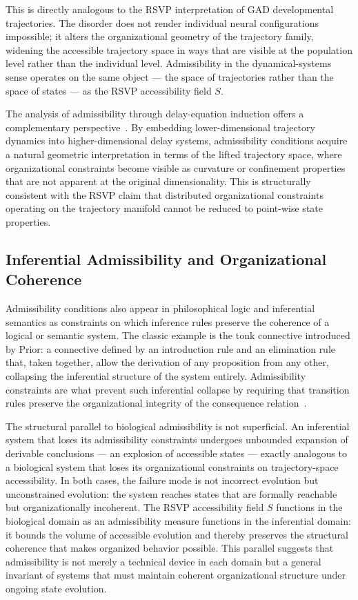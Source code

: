 \documentclass[11pt,a4paper]{article}
\theoremstyle{plain}
\theoremstyle{definition}
\begin{document}
This is directly analogous to the RSVP interpretation of GAD developmental trajectories.
The disorder does not render individual neural configurations impossible; it alters the
organizational geometry of the trajectory family, widening the accessible trajectory
space in ways that are visible at the population level rather than the individual level.
Admissibility in the dynamical-systems sense operates on the same object --- the space
of trajectories rather than the space of states --- as the RSVP accessibility field $S$.

The analysis of admissibility through delay-equation induction offers a complementary
perspective~\cite{Barreira2024}. By embedding lower-dimensional trajectory dynamics
into higher-dimensional delay systems, admissibility conditions acquire a natural
geometric interpretation in terms of the lifted trajectory space, where organizational
constraints become visible as curvature or confinement properties that are not apparent
at the original dimensionality. This is structurally consistent with the RSVP claim
that distributed organizational constraints operating on the trajectory manifold cannot
be reduced to point-wise state properties.

\subsection{Inferential Admissibility and Organizational Coherence}

Admissibility conditions also appear in philosophical logic and inferential semantics
as constraints on which inference rules preserve the coherence of a logical or semantic
system. The classic example is the tonk connective introduced by Prior: a connective
defined by an introduction rule and an elimination rule that, taken together, allow the
derivation of any proposition from any other, collapsing the inferential structure of
the system entirely. Admissibility constraints are what prevent such inferential collapse
by requiring that transition rules preserve the organizational integrity of the
consequence relation~\cite{Topey2026}.

The structural parallel to biological admissibility is not superficial. An inferential
system that loses its admissibility constraints undergoes unbounded expansion of
derivable conclusions --- an explosion of accessible states --- exactly analogous to a
biological system that loses its organizational constraints on trajectory-space accessibility.
In both cases, the failure mode is not incorrect evolution but unconstrained evolution:
the system reaches states that are formally reachable but organizationally incoherent.
The RSVP accessibility field $S$ functions in the biological domain as an admissibility
measure functions in the inferential domain: it bounds the volume of accessible evolution
and thereby preserves the structural coherence that makes organized behavior possible.
This parallel suggests that admissibility is not merely a technical device in each domain
but a general invariant of systems that must maintain coherent organizational structure
under ongoing state evolution.
\end{document}
